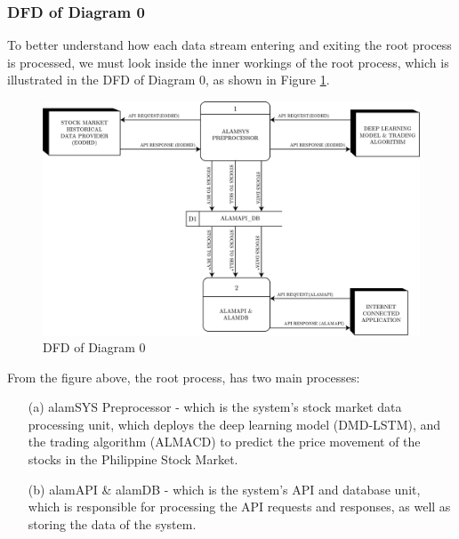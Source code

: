 \subsubsection{DFD of Diagram 0}
\label{subsubsec:dfd0}
To better understand how each data stream entering and exiting the root process is processed, 
we must look inside the inner workings of the root process, which is illustrated in the DFD of Diagram 0, 
as shown in Figure \ref{fig:dfd0}.
\begin{figure}[ht]
    \centering
    \includegraphics[width=1\textwidth]{./assets/Chapter_3/DFD/DFD_0.png}
    \caption{DFD of Diagram 0}
    \label{fig:dfd0}
\end{figure}
\FloatBarrier

From the figure above, the root process, has two main processes:
\begin{itemize}
    \item[(a)] alamSYS Preprocessor - which is the system’s stock market data processing unit, which deploys
    the deep learning model (DMD-LSTM), and the trading algorithm (ALMACD) to predict the price movement of the
    stocks in the Philippine Stock Market.
    \item[(b)] alamAPI \& alamDB - which is the system’s API and database unit, which is responsible for
    processing the API requests and responses, as well as storing the data of the system.
\end{itemize}

